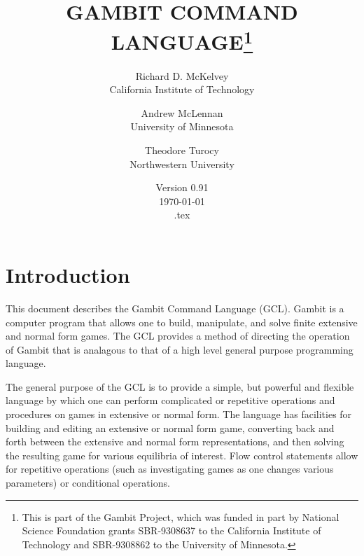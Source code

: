 %
%
%
\renewcommand{\baselinestretch}{.9}
\newcommand{\bd}{\begin{description}}
\newcommand{\ed}{\end{description}}



\title{GAMBIT COMMAND LANGUAGE\thanks{This is part of the Gambit
Project, which was funded in part by National Science Foundation
grants SBR-9308637 to the California Institute of Technology and
SBR-9308862 to the University of Minnesota.}}

\author{Richard D. McKelvey\\California Institute of
Technology
\and
Andrew McLennan\\University of
Minnesota
\and 
Theodore Turocy\\Northwestern University
}

\date{Version 0.91\\ \today\\ \jobname.tex}

\maketitle

\tableofcontents

\section{Introduction}

This document describes the Gambit Command Language (GCL).  Gambit is
a computer program that allows one to build, manipulate, and solve
finite extensive and normal form games. The GCL provides a method of
directing the operation of Gambit that is analagous to that of a high
level general purpose programming language.

The general purpose of the GCL is to provide a simple, but powerful
and flexible language by which one can perform complicated or
repetitive operations and procedures on games in extensive or normal
form.  The language has facilities for building and editing an
extensive or normal form game, converting back and forth between the
extensive and normal form representations, and then solving the
resulting game for various equilibria of interest. Flow
control statements allow for repetitive operations (such as
investigating games as one changes various parameters) or conditional
operations.

